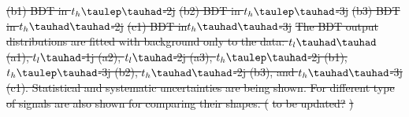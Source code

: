 \documentclass[PAPER, coverpage, atlasdraft=true, texlive=2016, UKenglish]{\ATLASLATEXPATH atlasdoc}
\providecommand{\DIFdel}[1]{{\protect\color{red}\sout{#1}}}                      %
\providecommand{\DIFdelend}{} %
\providecommand{\DIFdelFL}[1]{\DIFdel{#1}} %
\begin{document}
\DIFdelFL{(b1) BDT in $t_h\tlhad$-2j }%
\DIFdelFL{(b2) BDT in $t_h\tlhad$-3j }%
\DIFdelFL{(b3) BDT in $t_h\thadhad$-2j }%
\DIFdelFL{(c1) BDT in$t_h\thadhad$-3j}%
{%
\DIFdelFL{The BDT output distributions are fitted with background only to the data: $t_l\thadhad$ (a1),  $t_l\tauhad$-1j (a2),  $t_l\tauhad$-2j (a3),
  $t_h\tlhad$-2j (b1), $t_h\tlhad$-3j (b2), $t_h\thadhad$-2j (b3), and $t_h\thadhad$-3j (c1).
  Statistical and systematic uncertainties are being shown. For different type of signals are also shown for comparing their shapes. (}%
\DIFdelFL{to be updated?}%
\DIFdelFL{)}}
\DIFdelend %
\end{document}
